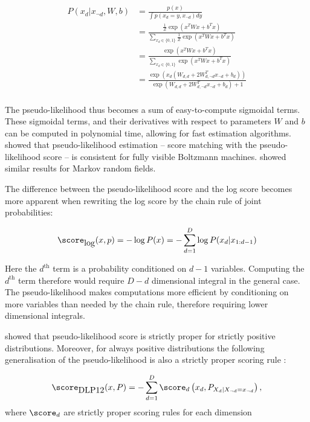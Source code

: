 \begin{align}
	P(x_d\vert x_{\neg d}, W, b) &= \frac{p(x)}{\int p(x_d=y,x_{\neg d}) dy}\\
		&= \frac{\frac{1}{Z}\exp(x^{T}Wx + b^{T}x)}{\sum_{x_d\in\{0,1\}}\frac{1}{Z}\exp(x^{T}Wx + b^{T}x)}\\
		&= \frac{\exp(x^{T}Wx + b^{T}x)}{\sum_{x_d\in\{0,1\}}\exp(x^{T}Wx + b^{T}x)}\\
		&= \frac{\exp\left( x_d \left( W_{d,d} + 2 W_{d,\neg d}^{T}x_{\neg d} + b_d \right)\right)}{\exp( W_{d,d} + 2 W_{d,\neg d}^{T}x_{\neg d} + b_{d}) + 1}\\
\end{align}

The pseudo-likelihood thus becomes a sum of easy-to-compute sigmoidal terms. These sigmoidal terms, and their derivatives with respect to parameters $W$ and $b$ can be computed in polynomial time, allowing for fast estimation algorithms. \citet{Hyvarinen2006} showed that pseudo-likelihood estimation -- score matching with the pseudo-likelihood score -- is consistent for fully visible Boltzmann machines. \citet{Besag1977,Comets1992} showed similar results for Markov random fields.

The difference between the pseudo-likelihood score and the log score becomes more apparent when rewriting the log score by the chain rule of joint probabilities:

\begin{equation}
	\score_{\mbox{log}}(x,p) = - \log P(x) =  - \sum_{d=1}^{D} \log P(x_d\vert x_{1:d-1})
\end{equation}

Here the $d^{\mbox{th}}$ term is a probability conditioned on $d-1$ variables. Computing the $d^{\mbox{th}}$ term therefore would require $D-d$ dimensional integral in the general case. The pseudo-likelihood makes computations more efficient by conditioning on more variables than needed by the chain rule, therefore requiring lower dimensional integrals.

\citet{Csiszar2004} showed that pseudo-likelihood score is strictly proper for strictly positive distributions. Moreover, for always positive distributions the following generalisation of the pseudo-likelihood is also a strictly proper scoring rule \citep*{Dawid2012}:

\begin{equation}
	\score_{\mbox{DLP12}}(x,P) = - \sum_{d=1}^{D} \score_d\left(x_d, P_{X_d \vert X_{\neg d}=x_{\neg d}}\right),
\end{equation}
where $\score_d$ are strictly proper scoring rules for each dimension

